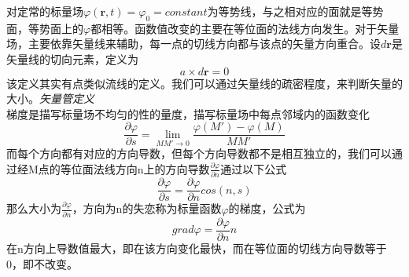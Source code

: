 \documentclass[a4paper]{report}
\begin{document}
 对定常的标量场$\varphi(\textbf{r},t)=\varphi_0=constant$为等势线，与之相对应的面就是等势面，等势面上的$\varphi$都相等。函数值改变的主要在等位面的法线方向发生。对于矢量场，主要依靠矢量线来辅助，每一点的切线方向都与该点的矢量方向重合。设$d\textbf{r}$是矢量线的切向元素，定义为
\begin{equation}
     a\times d\textbf{r} =0
\end{equation}
该定义其实有点类似流线的定义。我们可以通过矢量线的疏密程度，来判断矢量的大小。\textit{矢量管定义}\\
梯度是描写标量场不均匀的性的量度，描写标量场中每点邻域内的函数变化
\begin{equation}
	\frac{\partial\varphi}{\partial s}=\lim_{MM' \to 0}\frac{\varphi(M')-\varphi(M)}{MM'}
\end{equation}而每个方向都有对应的方向导数，但每个方向导数都不是相互独立的，我们可以通过经M点的等位面法线方向n上的方向导数$\frac{\partial \varphi}{\partial n}$通过以下公式
\begin{equation}
	\frac{\partial \varphi}{\partial s}=\frac{\partial \varphi}{\partial n}cos(n,s)
\end{equation}
那么大小为$\frac{\partial \varphi}{\partial n}$，方向为n的失恋称为标量函数$\varphi$的梯度，公式为
\begin{equation}
      grad \varphi=\frac{\partial \varphi}{\partial n} {n} 
\end{equation}
在n方向上导数值最大，即在该方向变化最快，而在等位面的切线方向导数等于0，即不改变。

\end{document}
